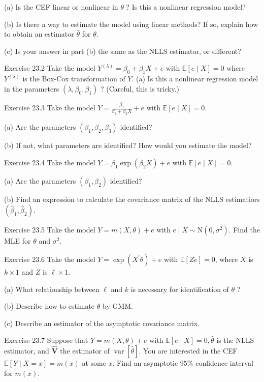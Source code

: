 \documentclass[10pt]{article}
\begin{document}
(a) Is the CEF linear or nonlinear in $\theta$ ? Is this a nonlinear regression model?

(b) Is there a way to estimate the model using linear methods? If so, explain how to obtain an estimator $\widehat{\theta}$ for $\theta$.

(c) Is your answer in part (b) the same as the NLLS estimator, or different?

Exercise 23.2 Take the model $Y^{(\lambda)}=\beta_{0}+\beta_{1} X+e$ with $\mathbb{E}[e \mid X]=0$ where $Y^{(\lambda)}$ is the Box-Cox transformation of $Y$. (a) Is this a nonlinear regression model in the parameters $\left(\lambda, \beta_{0}, \beta_{1}\right)$ ? (Careful, this is tricky.)

Exercise 23.3 Take the model $Y=\frac{\beta_{1}}{\beta_{2}+\beta_{3} X}+e$ with $\mathbb{E}[e \mid X]=0$.

(a) Are the parameters $\left(\beta_{1}, \beta_{2}, \beta_{3}\right)$ identified?

(b) If not, what parameters are identified? How would you estimate the model?

Exercise 23.4 Take the model $Y=\beta_{1} \exp \left(\beta_{2} X\right)+e$ with $\mathbb{E}[e \mid X]=0$.

(a) Are the parameters $\left(\beta_{1}, \beta_{2}\right)$ identified?

(b) Find an expression to calculate the covariance matrix of the NLLS estimatiors $\left(\widehat{\beta}_{1}, \widehat{\beta}_{2}\right)$.

Exercise 23.5 Take the model $Y=m(X, \theta)+e$ with $e \mid X \sim \mathrm{N}\left(0, \sigma^{2}\right)$. Find the MLE for $\theta$ and $\sigma^{2}$.

Exercise 23.6 Take the model $Y=\exp \left(X^{\prime} \theta\right)+e$ with $\mathbb{E}[Z e]=0$, where $X$ is $k \times 1$ and $Z$ is $\ell \times 1$.

(a) What relationship between $\ell$ and $k$ is necessary for identification of $\theta$ ?

(b) Describe how to estimate $\theta$ by GMM.

(c) Describe an estimator of the asymptotic covariance matrix.

Exercise 23.7 Suppose that $Y=m(X, \theta)+e$ with $\mathbb{E}[e \mid X]=0, \widehat{\theta}$ is the NLLS estimator, and $\widehat{\boldsymbol{V}}$ the estimator of $\operatorname{var}[\widehat{\theta}]$. You are interested in the CEF $\mathbb{E}[Y \mid X=x]=m(x)$ at some $x$. Find an asymptotic $95 \%$ confidence interval for $m(x)$.
\end{document}
